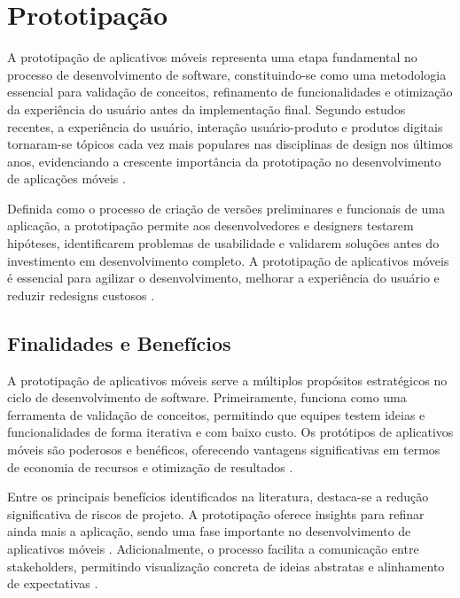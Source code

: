 \chapter{Prototipação}

A prototipação de aplicativos móveis representa uma etapa fundamental no processo de desenvolvimento de software, constituindo-se como uma metodologia essencial para validação de conceitos, refinamento de funcionalidades e otimização da experiência do usuário antes da implementação final. Segundo estudos recentes, a experiência do usuário, interação usuário-produto e produtos digitais tornaram-se tópicos cada vez mais populares nas disciplinas de design nos últimos anos, evidenciando a crescente importância da prototipação no desenvolvimento de aplicações móveis \cite{sciencedirect_design_approaches}.

Definida como o processo de criação de versões preliminares e funcionais de uma aplicação, a prototipação permite aos desenvolvedores e designers testarem hipóteses, identificarem problemas de usabilidade e validarem soluções antes do investimento em desenvolvimento completo. A prototipação de aplicativos móveis é essencial para agilizar o desenvolvimento, melhorar a experiência do usuário e reduzir redesigns custosos \cite{decode_benefits}.

\section{Finalidades e Benefícios}

A prototipação de aplicativos móveis serve a múltiplos propósitos estratégicos no ciclo de desenvolvimento de software. Primeiramente, funciona como uma ferramenta de validação de conceitos, permitindo que equipes testem ideias e funcionalidades de forma iterativa e com baixo custo. Os protótipos de aplicativos móveis são poderosos e benéficos, oferecendo vantagens significativas em termos de economia de recursos e otimização de resultados \cite{gojilabs_essential}.

Entre os principais benefícios identificados na literatura, destaca-se a redução significativa de riscos de projeto. A prototipação oferece insights para refinar ainda mais a aplicação, sendo uma fase importante no desenvolvimento de aplicativos móveis \cite{softsuave_guide}. Adicionalmente, o processo facilita a comunicação entre stakeholders, permitindo visualização concreta de ideias abstratas e alinhamento de expectativas \cite{okoone_benefits}.

